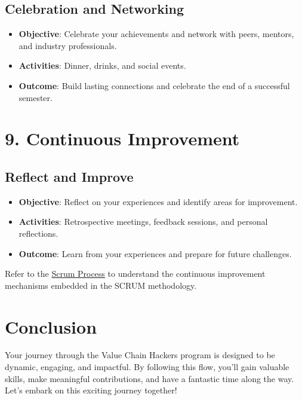 \documentclass[
  letterpaper,
  DIV=11,
  numbers=noendperiod]{scrreprt}
\providecommand{\tightlist}{%
  \setlength{\itemsep}{0pt}\setlength{\parskip}{0pt}}\usepackage{longtable,booktabs,array}
\begin{document}
\subsection{Celebration and Networking
🎉}\label{celebration-and-networking}

\begin{itemize}
\tightlist
\item
  \textbf{Objective}: Celebrate your achievements and network with
  peers, mentors, and industry professionals.
\item
  \textbf{Activities}: Dinner, drinks, and social events.
\item
  \textbf{Outcome}: Build lasting connections and celebrate the end of a
  successful semester.
\end{itemize}

\section{9. Continuous Improvement 🔄}\label{continuous-improvement-2}

\subsection{Reflect and Improve 🌟}\label{reflect-and-improve}

\begin{itemize}
\tightlist
\item
  \textbf{Objective}: Reflect on your experiences and identify areas for
  improvement.
\item
  \textbf{Activities}: Retrospective meetings, feedback sessions, and
  personal reflections.
\item
  \textbf{Outcome}: Learn from your experiences and prepare for future
  challenges.
\end{itemize}

Refer to the \href{scrum-process.qmd}{Scrum Process} to understand the
continuous improvement mechanisms embedded in the SCRUM methodology.

\section{Conclusion}\label{conclusion-4}

Your journey through the Value Chain Hackers program is designed to be
dynamic, engaging, and impactful. By following this flow, you'll gain
valuable skills, make meaningful contributions, and have a fantastic
time along the way. Let's embark on this exciting journey together! 🚀🌟
\end{document}
